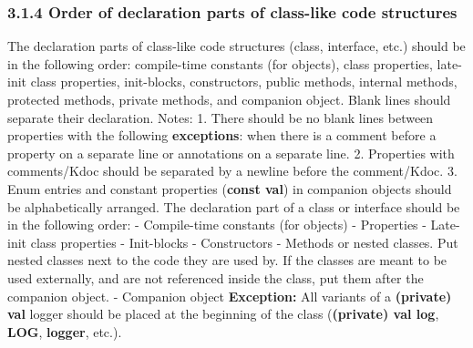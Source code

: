 \subsubsection*{\textbf{3.1.4 Order of declaration parts of class-like code structures}}
\leavevmode\newline
\label{sec:3.1.4}
The declaration parts of class-like code structures (class, interface, etc.) should be in the following order: compile-time constants (for objects), class properties, late-init class properties, init-blocks, constructors, public methods, internal methods, protected methods, private methods, and companion object. Blank lines should separate their declaration.
Notes:
1.	There should be no blank lines between properties with the following \textbf{exceptions}: when there is a comment before a property on a separate line or annotations on a separate line.
2.	Properties with comments/Kdoc should be separated by a newline before the comment/Kdoc.
3.	Enum entries and constant properties (\textbf{const val}) in companion objects should be alphabetically arranged.
The declaration part of a class or interface should be in the following order:
- Compile-time constants (for objects)
- Properties
- Late-init class properties
- Init-blocks
- Constructors
- Methods or nested classes. Put nested classes next to the code they are used by.
If the classes are meant to be used externally, and are not referenced inside the class, put them after the companion object.
- Companion object
\textbf{Exception:}
All variants of a \textbf{(private) val} logger should be placed at the beginning of the class (\textbf{(private) val log}, \textbf{LOG}, \textbf{logger}, etc.).
